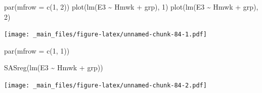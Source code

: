 \documentclass[
]{book}
\newenvironment{Shaded}{\begin{snugshade}}{\end{snugshade}}
\newcommand{\AttributeTok}[1]{\textcolor[rgb]{0.77,0.63,0.00}{#1}}
\newcommand{\DecValTok}[1]{\textcolor[rgb]{0.00,0.00,0.81}{#1}}
\newcommand{\FunctionTok}[1]{\textcolor[rgb]{0.00,0.00,0.00}{#1}}
\newcommand{\NormalTok}[1]{#1}
\newcommand{\SpecialCharTok}[1]{\textcolor[rgb]{0.00,0.00,0.00}{#1}}
\begin{document}
\begin{Shaded}
\begin{Highlighting}[]
\FunctionTok{par}\NormalTok{(}\AttributeTok{mfrow =} \FunctionTok{c}\NormalTok{(}\DecValTok{1}\NormalTok{, }\DecValTok{2}\NormalTok{))}
\FunctionTok{plot}\NormalTok{(}\FunctionTok{lm}\NormalTok{(E3 }\SpecialCharTok{\textasciitilde{}}\NormalTok{ Hmwk }\SpecialCharTok{+}\NormalTok{ grp), }\DecValTok{1}\NormalTok{)}
\FunctionTok{plot}\NormalTok{(}\FunctionTok{lm}\NormalTok{(E3 }\SpecialCharTok{\textasciitilde{}}\NormalTok{ Hmwk }\SpecialCharTok{+}\NormalTok{ grp), }\DecValTok{2}\NormalTok{)}
\end{Highlighting}
\end{Shaded}

\texttt{[image: \_main\_files/figure-latex/unnamed-chunk-84-1.pdf]}

\begin{Shaded}
\begin{Highlighting}[]
\FunctionTok{par}\NormalTok{(}\AttributeTok{mfrow =} \FunctionTok{c}\NormalTok{(}\DecValTok{1}\NormalTok{, }\DecValTok{1}\NormalTok{))}

\FunctionTok{SASreg}\NormalTok{(}\FunctionTok{lm}\NormalTok{(E3 }\SpecialCharTok{\textasciitilde{}}\NormalTok{ Hmwk }\SpecialCharTok{+}\NormalTok{ grp))}
\end{Highlighting}
\end{Shaded}

\texttt{[image: \_main\_files/figure-latex/unnamed-chunk-84-2.pdf]}
\end{document}

